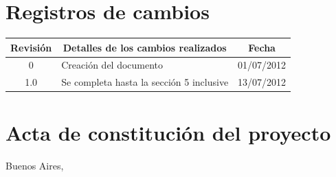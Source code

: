 \documentclass[
11pt, %
codirector, %
]{charter}
\begin{document}
\maketitle
\thispagestyle{empty}
\pagebreak


\thispagestyle{empty}
{\setlength{\parskip}{0pt}
\tableofcontents{}
}
\pagebreak


\section*{Registros de cambios}
\label{sec:registro}


\begin{table}[ht]
\label{tab:registro}
\centering
\begin{tabularx}{\linewidth}{@{}|c|X|c|@{}}
\hline
\rowcolor[HTML]{C0C0C0} 
Revisión & \multicolumn{1}{c|}{\cellcolor[HTML]{C0C0C0}Detalles de los cambios realizados} & Fecha      \\ \hline
0      & Creación del documento                                 & 01/07/2012 \\ \hline
1.0      & Se completa hasta la sección 5 inclusive                 & 13/07/2012 \\ \hline
\end{tabularx}
\end{table}

\pagebreak



\section*{Acta de constitución del proyecto}
\label{sec:acta}

\begin{flushright}
Buenos Aires, \fechaInicioName
\end{flushright}

\vspace{2cm}
\end{document}
